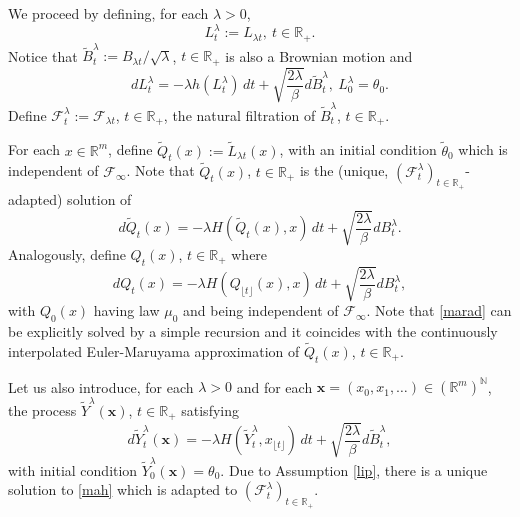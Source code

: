 \documentclass[a4paper,draft]{article}
\begin{document}
We proceed by defining, for each $\lambda>0$,
$$
L^{\lambda}_t:=L_{\lambda t},\ t\in\mathbb{R}_+.
$$
Notice that $\tilde{B}^{\lambda}_t:=B_{\lambda t}/\sqrt{\lambda}$, $t\in\mathbb{R}_+$
is also a Brownian motion and 
\begin{equation}\label{kell}
dL^{\lambda}_t=-\lambda h(L^{\lambda}_t)\, dt+\sqrt{\frac{2\lambda}{\beta}}d\tilde{B}^{\lambda}_t,\
L^{\lambda}_0=\theta_0.
\end{equation}
Define $\mathcal{F}_t^{\lambda}:=\mathcal{F}_{\lambda t}$, $t\in\mathbb{R}_+$, the natural
filtration of $\tilde{B}^{\lambda}_t$, $t\in\mathbb{R}_+$.

For each $x\in\mathbb{R}^m$,
define $\tilde{Q}_{t}(x):=\tilde{L}_{\lambda t}(x)$, 
with an initial condition $\tilde{\theta}_0$
which is independent of $\mathcal{F}_{\infty}$.
Note that $\tilde{Q}_t(x)$, $t\in \mathbb{R}_+$ is the (unique, $(\mathcal{F}_t^{\lambda})_{t\in\mathbb{R}_+}$-adapted) solution of
\begin{equation}\label{seuso}
d\tilde{Q}_t(x)=-\lambda H(\tilde{Q}_t(x),x)\, dt+\sqrt{\frac{2\lambda}{\beta}}dB^{\lambda}_t.
\end{equation}
Analogously,
define $Q_t(x)$, $t\in\mathbb{R}_+$
where
\begin{equation}\label{marad}
d{Q}_t(x)=-\lambda H({Q}_{\lfloor t\rfloor}(x),x)\, dt+\sqrt{\frac{2\lambda}{\beta}}dB^{\lambda}_t,
\end{equation}
with $Q_0(x)$ having law $\mu_0$ and being independent of $\mathcal{F}_{\infty}$.
Note that \eqref{marad} can be explicitly solved by a simple recursion and it coincides
with the continuously interpolated Euler-Maruyama approximation of $\tilde{Q}_t(x)$, $t\in\mathbb{R}_+$.

Let us also introduce, for each $\lambda>0$ and for each 
$\mathbf{x}=(x_0,x_1,\ldots)\in(\mathbb{R}^m)^{\mathbb{N}}$, the process $\tilde{Y}^{\lambda}(\mathbf{x})$,
$t\in\mathbb{R}_+$ satisfying
\begin{equation}\label{mah}
d\tilde{Y}^{\lambda}_t(\mathbf{x})=-\lambda H(\tilde{Y}^{\lambda}_t,
x_{\lfloor t\rfloor})\, dt+\sqrt{\frac{2\lambda}{\beta}}d\tilde{B}^{\lambda}_{t},
\end{equation}
with initial condition $\tilde{Y}^{\lambda}_0(\mathbf{x})=\theta_0$.
Due to Assumption \ref{lip}, there is a unique
solution to \eqref{mah} which is adapted to
$(\mathcal{F}_t^{\lambda})_{t\in\mathbb{R}_+}$.
\end{document}
